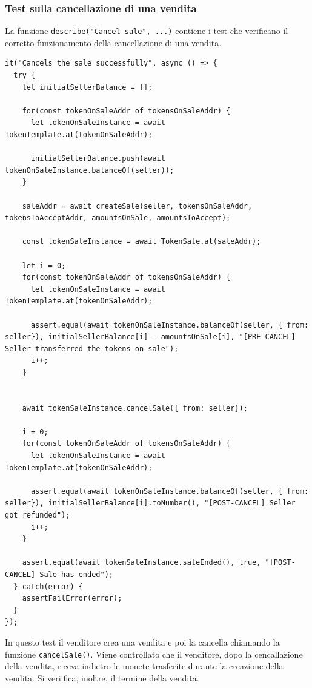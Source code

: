 \documentclass[a4paper]{article}
\begin{document}
        \subsubsection{Test sulla cancellazione di una vendita}
        La funzione \verb|describe("Cancel sale", ...)| contiene i test che verificano il corretto funzionamento della cancellazione di una vendita.
\begin{lstlisting}[style=ES6, title={La vendita viene correttamente cancellata}]
it("Cancels the sale successfully", async () => {
  try {
    let initialSellerBalance = [];

    for(const tokenOnSaleAddr of tokensOnSaleAddr) {
      let tokenOnSaleInstance = await TokenTemplate.at(tokenOnSaleAddr);
      
      initialSellerBalance.push(await tokenOnSaleInstance.balanceOf(seller));
    }

    saleAddr = await createSale(seller, tokensOnSaleAddr, tokensToAcceptAddr, amountsOnSale, amountsToAccept);

    const tokenSaleInstance = await TokenSale.at(saleAddr);

    let i = 0;
    for(const tokenOnSaleAddr of tokensOnSaleAddr) {
      let tokenOnSaleInstance = await TokenTemplate.at(tokenOnSaleAddr);

      assert.equal(await tokenOnSaleInstance.balanceOf(seller, { from: seller}), initialSellerBalance[i] - amountsOnSale[i], "[PRE-CANCEL] Seller transferred the tokens on sale");
      i++;
    }
    

    await tokenSaleInstance.cancelSale({ from: seller});

    i = 0;
    for(const tokenOnSaleAddr of tokensOnSaleAddr) {
      let tokenOnSaleInstance = await TokenTemplate.at(tokenOnSaleAddr);
      
      assert.equal(await tokenOnSaleInstance.balanceOf(seller, { from: seller}), initialSellerBalance[i].toNumber(), "[POST-CANCEL] Seller got refunded");
      i++;
    }

    assert.equal(await tokenSaleInstance.saleEnded(), true, "[POST-CANCEL] Sale has ended");
  } catch(error) {
    assertFailError(error);
  }
});
\end{lstlisting}
        In questo test il venditore crea una vendita e poi la cancella chiamando la funzione \verb|cancelSale()|. Viene controllato che il venditore, dopo la cencallazione della vendita, riceva indietro le monete trasferite durante la creazione della vendita. Si veriifica, inoltre, il termine della vendita.
\end{document}
